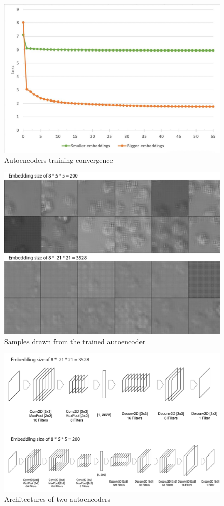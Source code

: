 \begin{figure}[htb]
	\begin{center}
		\includegraphics[width=0.5\linewidth]{bilder/ae-embeddings/training.jpg}
		\caption{Autoencoders training convergence}\label{fig:ae-training}
	\end{center}
\end{figure}

\begin{figure}[htb]
	\begin{center}
		\includegraphics[width=0.5\linewidth]{bilder/ae-embeddings/ae-samples.png}
		\caption{Samples drawn from the trained autoencoder}\label{fig:ae-samples}
	\end{center}
\end{figure}

\begin{figure}[htb]
	\begin{center}
		\includegraphics[width=0.5\linewidth]{bilder/ae-embeddings/ae-architecture.png}
		\caption{Architectures of two autoencoders}\label{fig:ae-architecture}
	\end{center}
\end{figure}

